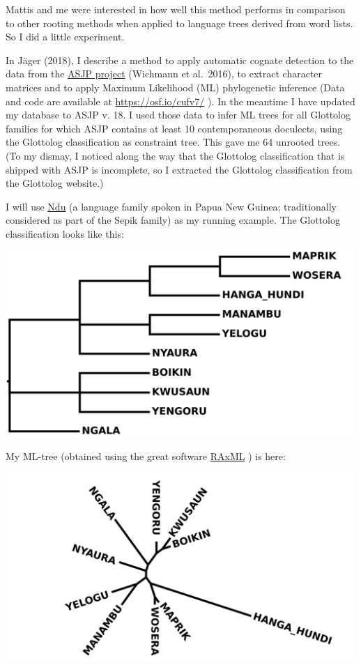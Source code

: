 \documentclass[
  a4paper,
  14pt,
  oneside,
  tablecaptionabove
]{scrbook}
\begin{document}
{Mattis and me were interested in how well this method performs in
comparison to other rooting methods when applied to language trees
derived from word lists. So I did a little experiment.}

{In Jäger (2018), I describe a method to apply automatic cognate
detection to the data from the \href{https://asjp.clld.org/}{ASJP
project} (Wichmann et al.~2016), to extract character matrices and to
apply Maximum Likelihood (ML) phylogenetic inference (Data and code are
available at \url{https://osf.io/cufv7/} ). In the meantime I have
updated my database to ASJP v. 18. I used those data to infer ML trees
for all Glottolog families for which ASJP contains at least 10
contemporaneous doculects, using the Glottolog classification as
constraint tree. This gave me 64 unrooted trees. (To my dismay, I
noticed along the way that the Glottolog classification that is shipped
with ASJP is incomplete, so I extracted the Glottolog classification
from the Glottolog website.)}

{I will use
\href{https://glottolog.org/resource/languoid/id/nduu1242}{Ndu} (a
language family spoken in Papua New Guinea; traditionally considered as
part of the Sepik family) as my running example. The Glottolog
classification looks like this:}

{\includegraphics[width=5.21875in,height=2.78125in]{images/Ndu.glot.jpg}}

{My ML-tree (obtained using the great software
\href{https://cme.h-its.org/exelixis/web/software/raxml/index.html}{RAxML}
) is here:}

{\includegraphics[width=5.21875in,height=2.78125in]{images/Ndu.unrooted.jpg}}
\end{document}
